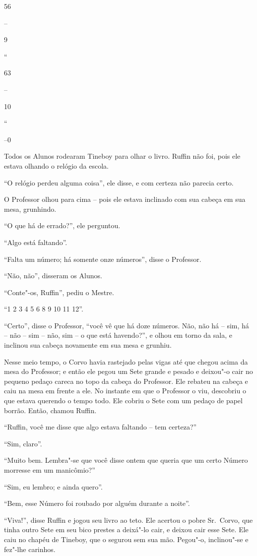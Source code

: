56

--

9

``

63

--

10

``

--0

Todos os Alunos rodearam Tineboy para olhar o livro. Ruffin não foi,
pois ele estava olhando o relógio da escola.

``O relógio perdeu alguma coisa'', ele disse, e com certeza não parecia
certo.

O Professor olhou para cima -- pois ele estava inclinado com sua cabeça
em sua mesa, grunhindo.

``O que há de errado?'', ele perguntou.

``Algo está faltando''.

``Falta um número; há somente onze números'', disse o Professor.

``Não, não'', disseram os Alunos.

``Conte"-os, Ruffin'', pediu o Mestre.

``1 2 3 4 5 6 8 9 10 11 12''.

``Certo'', disse o Professor, ``você vê que há doze números. Não, não há
-- sim, há -- não -- sim -- não, sim -- o que está havendo?'', e olhou
em torno da sala, e inclinou sua cabeça novamente em sua mesa e grunhiu.

Nesse meio tempo, o Corvo havia rastejado pelas vigas até que chegou
acima da mesa do Professor; e então ele pegou um Sete grande e pesado e
deixou"-o cair no pequeno pedaço careca no topo da cabeça do Professor.
Ele rebateu na cabeça e caiu na mesa em frente a ele. No instante em que
o Professor o viu, descobriu o que estava querendo o tempo todo. Ele
cobriu o Sete com um pedaço de papel borrão. Então, chamou Ruffin.

``Ruffin, você me disse que algo estava faltando -- tem certeza?''

``Sim, claro''.

``Muito bem. Lembra"-se que você disse ontem que queria que um certo
Número morresse em um manicômio?''

``Sim, eu lembro; e ainda quero''.

``Bem, esse Número foi roubado por alguém durante a noite''.

``Viva!'', disse Ruffin e jogou seu livro ao teto. Ele acertou o pobre
Sr.~Corvo, que tinha outro Sete em seu bico prestes a deixá"-lo cair, e
deixou cair esse Sete. Ele caiu no chapéu de Tineboy, que o segurou sem
sua mão. Pegou"-o, inclinou"-se e fez"-lhe carinhos.

